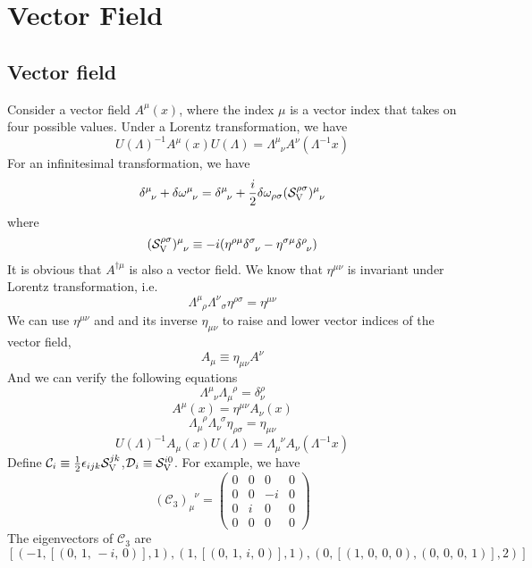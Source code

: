 \chapter{Vector Field}
\section{Vector field}
Consider a vector field $A^{\mu}(x)$, where the index $\mu$ is a vector index that takes on four possible values. 
Under a Lorentz transformation, we have
\[U(\Lambda)^{-1} A^{\mu}(x) U(\Lambda) = \Lambda^{\mu}_{\phantom{\mu}\nu} A^{\nu}(\Lambda^{-1}x)\]
For an infinitesimal transformation, we have
\[\delta^{\mu}_{\phantom{\mu}\nu}+\delta \omega ^{\mu}_{\phantom{\mu}\nu} = \delta^{\mu}_{\phantom{\mu}\nu} + \frac{i}{2} \delta \omega_{\rho \sigma} (\mathcal{S}_{\rm V}^{\rho \sigma})^{\mu}_{\phantom{\mu}\nu}\]
where
\[(\mathcal{S}_{\rm V}^{\rho \sigma})^{\mu}_{\phantom{\mu}\nu} \equiv -i(\eta^{\rho \mu}\delta ^{\sigma}_{\phantom{\sigma}\nu} - \eta^{\sigma \mu}\delta^{\rho}_{\phantom{\rho}\nu})\]
It is obvious that $A^{\dagger \mu}$ is also a vector field. 
We know that $\eta^{\mu \nu}$ is invariant under Lorentz transformation, i.e.
\[\Lambda^{\mu}_{\phantom{\mu}\rho} \Lambda^{\nu}_{\phantom{\mu}\sigma} \eta^{\rho \sigma} = \eta^{\mu \nu} \]
We can use $\eta^{\mu \nu}$ and and its inverse $\eta_{\mu\nu}$ to raise and lower vector indices of the vector field,
\[A_{\mu} \equiv \eta_{\mu \nu} A^{\nu}\]
And we can verify the following equations
\[\Lambda^{\mu}_{\phantom{\mu}\nu} \Lambda_{\mu}^{\phantom{\mu}\rho} = \delta^{\rho}_{\nu} \]
\[A^{\mu}(x) = \eta^{\mu \nu} A_{\nu}(x)\]
\[\Lambda_{\mu}^{\phantom{\mu}\rho} \Lambda_{\nu}^{\phantom{\nu}\sigma} \eta_{\rho \sigma} = \eta_{\mu \nu}\]
\[U(\Lambda)^{-1} A_{\mu}(x) U(\Lambda) = \Lambda_{\mu}^{\phantom{\mu}\nu} A_{\nu}(\Lambda^{-1}x)\]
Define $\mathcal{C}_i \equiv \frac{1}{2}\epsilon_{ijk}\mathcal{S}_{\rm V}^{jk}$,$\mathcal{D}_i \equiv \mathcal{S}_{\rm V}^{i0}$. For example, we have
\[(\mathcal{C}_3)_{\mu}^{\phantom{\mu}\nu} = \left(\begin{array}{rrrr}
0 & 0 & 0 & 0 \\
0 & 0 & -i & 0 \\
0 & i & 0 & 0 \\
0 & 0 & 0 & 0
\end{array}\right)\]
The eigenvectors of $\mathcal{C}_3$ are
\[\left[\left(-1, \left[\left(0,\,1,\,-i,\,0\right)\right], 1\right),
\left(1, \left[\left(0,\,1,\,i,\,0\right)\right], 1\right), \left(0,
\left[\left(1,\,0,\,0,\,0\right), \left(0,\,0,\,0,\,1\right)\right],
2\right)\right]\]
